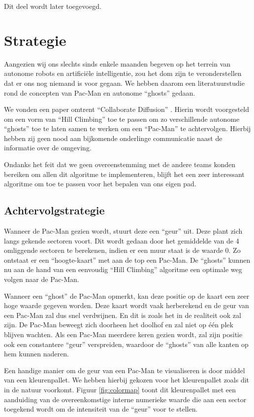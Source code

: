 \documentclass[12pt,a4paper]{report}
\begin{document}
Dit deel wordt later toegevoegd.

\chapter{Strategie}

Aangezien wij ons slechts sinds enkele maanden begeven op het terrein van autonome robots en artifici\"ele intelligentie, zou het dom zijn te veronderstellen dat er ons nog niemand is voor gegaan. We hebben daarom een literatuurstudie rond de concepten van Pac-Man en autonome ``ghosts'' gedaan.

We vonden een paper omtrent ``Collaborate Diffusion'' \cite{Repenning06}. Hierin wordt voorgesteld om een vorm van ``Hill Climbing'' toe te passen om zo verschillende autonome ``ghosts'' toe te laten samen te werken om een ``Pac-Man'' te achtervolgen. Hierbij hebben zij geen nood aan bijkomende onderlinge communicatie naast de informatie over de omgeving.

Ondanks het feit dat we geen overeenstemming met de andere teams konden bereiken om allen dit algoritme te implementeren, blijft het een zeer interessant algoritme om toe te passen voor het bepalen van ons eigen pad.

\section{Achtervolgstrategie}

Wanneer de Pac-Man gezien wordt, stuurt deze een ``geur'' uit. Deze plant zich langs gekende sectoren voort. Dit wordt gedaan door het gemiddelde van de 4 omliggende sectoren te berekenen, indien er een muur staat is de waarde 0. Zo ontstaat er een ``hoogte-kaart'' met aan de top een Pac-Man. De ``ghosts'' kunnen nu aan de hand van een eenvoudig ``Hill Climbing'' algoritme een optimale weg volgen naar de Pac-Man.

Wanneer een ``ghost'' de Pac-Man opmerkt, kan deze positie op de kaart een zeer hoge waarde gegeven worden. Deze kaart wordt vaak herberekend en de geur van een Pac-Man zal dus snel verdwijnen. En dit is zoals het in de realiteit ook zal zijn. De Pac-Man beweegt zich doorheen het doolhof en zal niet op \'e\'en plek blijven wachten. Als een Pac-Man meerdere keren gezien wordt, zal zijn positie ook een constantere ``geur'' verspreiden, waardoor de ``ghosts'' van alle kanten op hem kunnen naderen. 

Een handige manier om de geur van een Pac-Man te visualiseren is door middel van een kleurenpallet. We hebben hierbij gekozen voor het kleurenpallet zoals dit in de natuur voorkomt. Figuur \ref{fig:colormap} toont dit kleurenpallet met een aanduiding van de overeenkomstige interne numerieke waarde die aan een sector toegekend wordt om de intensiteit van de ``geur'' voor te stellen.
\end{document}
